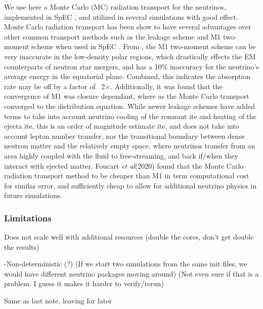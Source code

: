 \documentclass[%
twocolumn,
superscriptaddress,
nofootinbib,
 amsmath,amssymb,
 aps, prd
]{revtex4-2}
\newcommand{\alex}[1]{\color{red}{#1}}
\newcommand{\etal}[0]{\textit{et al}}
\begin{document}
          We use here a Monte Carlo (MC) radiation transport for the neutrinos, implemented in SpEC \cite{Foucart_2021}, and utilized in several simulations \cite{Foucart_2020,Foucart_2023} with good effect.
          Monte Carlo radiation transport has been show to have several advantages over other common transport methods such as the leakage scheme and M1 two-moment scheme when used in SpEC \cite{Foucart_201801,Foucart_201806}.
          From \cite{Foucart_201806}, the M1 two-moment scheme can be very inaccurate in the low-density polar regions, which drastically effects the EM counterparts of neutron star mergers, and has a 10\% inaccuracy for the neutrino's average energy in the equatorial plane.
          Combined, this indicates the absorption rate may be off by a factor of ~2$\times$.
          Additionally, it was found that the convergence of M1 was closure dependant, where as the Monte Carlo transport converged to the distribution equation.
          While newer leakage schemes have added terms to take into account neutrino cooling of the remnant {\alex cite} and heating of the ejecta {\alex cite}, this is an order of magnitude estimate {\alex cite}, and does not take into account lepton number transfer, nor the transitional boundary between dense neutron matter and the relatively empty space, where neutrinos transfer from an area highly coupled with the fluid to free-streaming, and back if/when they interact with ejected matter.
          Foucart \etal (2020) \cite{Foucart_2020} found that the Monte Carlo radiation transport method to be cheaper than M1 in term computational cost for similar error, and sufficiently cheap to allow for additional neutrino physics in future simulations.

      \subsubsection{Limitations}
      {\alex

        -Does not scale well with additional resources (double the cores, don't get double the results)

        -Non-deterministic (?) (If we start two simulations from the same init files, we would have different neutrino packages moving around) (Not even sure if that is a problem. I guess it makes it harder to verify/rerun)

        Same as last note, leaving for later}
\end{document}
